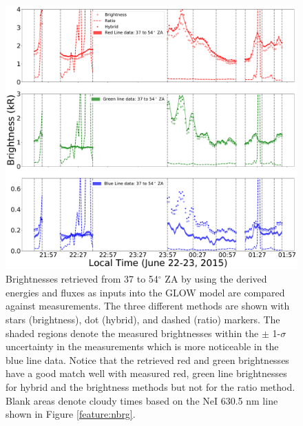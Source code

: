 \begin{figure}
	\centering\includegraphics[width=35pc]{different_method_retriv_comp.pdf}
	\caption{Brightnesses retrieved from 37 to 54$^\circ$ ZA by using the derived energies and fluxes as inputs into the GLOW model are compared against measurements. The three different methods are shown with stars (brightness), dot (hybrid), and dashed (ratio) markers. The shaded regions denote the measured brightnesses within the $\pm$ 1-$\sigma$ uncertainty in the measurements which is more noticeable in the blue line data. Notice that the retrieved red and green brightnesses have a good match well with measured red, green line brightnesses for hybrid and the brightness methods but not for the ratio method. Blank areas denote cloudy times based on the NeI 630.5 nm line shown in Figure \ref{feature:nbrg}.}
	\label{fig:e_fl_b_comp}
\end{figure}
